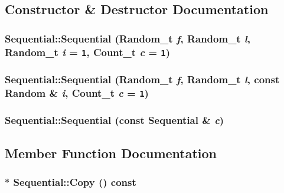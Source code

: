 \subsection{Constructor \& Destructor Documentation}
\hypertarget{classSequential_0b22b2f44a9805cbfe5007cc73874617}{
\subsubsection[{Sequential}]{\setlength{\rightskip}{0pt plus 5cm}Sequential::Sequential ({\bf Random\_\-t} {\em f}, \/  {\bf Random\_\-t} {\em l}, \/  {\bf Random\_\-t} {\em i} = {\tt 1}, \/  {\bf Count\_\-t} {\em c} = {\tt 1})}}
\label{classSequential_0b22b2f44a9805cbfe5007cc73874617}


\hypertarget{classSequential_67f7f4c3a03f10d2c155f414a2bdbe12}{
\subsubsection[{Sequential}]{\setlength{\rightskip}{0pt plus 5cm}Sequential::Sequential ({\bf Random\_\-t} {\em f}, \/  {\bf Random\_\-t} {\em l}, \/  const {\bf Random} \& {\em i}, \/  {\bf Count\_\-t} {\em c} = {\tt 1})}}
\label{classSequential_67f7f4c3a03f10d2c155f414a2bdbe12}


\hypertarget{classSequential_82b76aef339451a4c79c460342d169f0}{
\subsubsection[{Sequential}]{\setlength{\rightskip}{0pt plus 5cm}Sequential::Sequential (const {\bf Sequential} \& {\em c})}}
\label{classSequential_82b76aef339451a4c79c460342d169f0}




\subsection{Member Function Documentation}
\hypertarget{classSequential_8a26193ea7fa5a8d7266c9a963028fe1}{
\subsubsection[{Copy}]{ $\ast$ Sequential::Copy () const}}
\label{classSequential_8a26193ea7fa5a8d7266c9a963028fe1}




